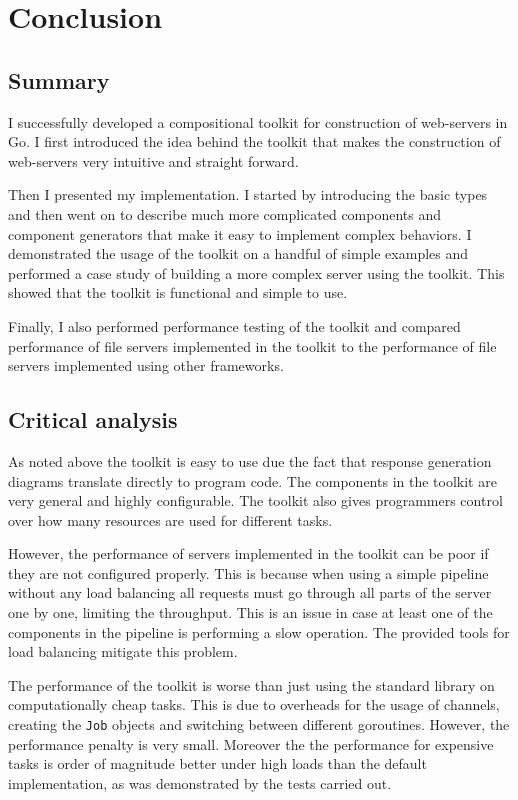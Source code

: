 \section{Conclusion}
\label{sec:conclusion}
\subsection{Summary}
I successfully developed a compositional toolkit for construction of 
web-servers in Go. I first introduced the idea behind the toolkit that 
makes the construction of web-servers very intuitive and straight forward. 

Then I presented my implementation. I started by introducing the basic types
and then went on to describe much more complicated components and component generators
that make it easy to implement complex behaviors. I demonstrated the usage of the 
toolkit on a handful of simple examples and performed a case study of building
a more complex server using the toolkit. This showed that the toolkit is
functional and simple to use. 

Finally, I also performed performance testing of the toolkit and compared
performance of file servers implemented in the toolkit to the performance
of file servers implemented using other frameworks.

\subsection{Critical analysis}
As noted above the toolkit is easy to use due the fact that response 
generation diagrams translate directly to program code. The components
in the toolkit are very general and highly configurable. The toolkit
also gives programmers control over how many resources are used for 
different tasks. 

However, the performance of servers implemented in the toolkit can be 
poor if they are not configured properly. This is because when using a simple
pipeline without any load balancing all requests must go through all parts
of the server one by one, limiting the throughput. This is an issue 
in case at least one of the components in the pipeline is performing a slow operation.
The provided tools for load balancing mitigate this problem.

The performance of the toolkit is worse than just using the standard library
on computationally cheap tasks. This is due to overheads
for the usage of channels, creating the \texttt{Job} objects
and switching between different goroutines. However, the performance
penalty is very small. Moreover the the performance for expensive 
tasks is order of magnitude better under high loads than the default implementation,
as was demonstrated by the tests carried out.

